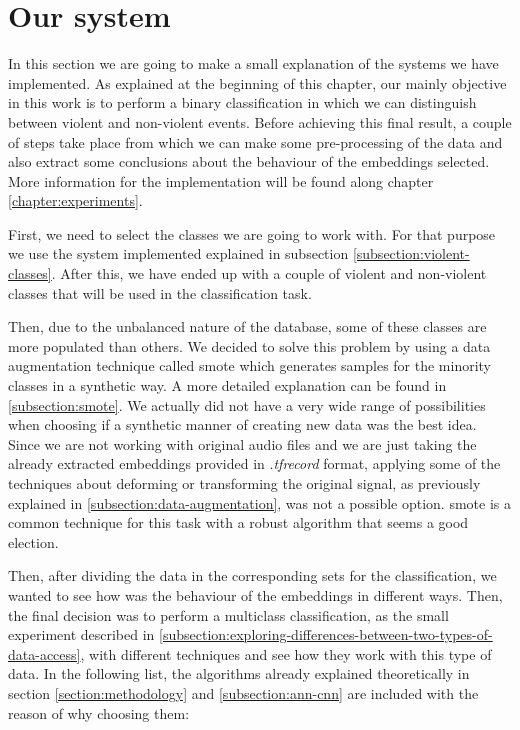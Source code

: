 \section{Our system}
\label{section:our-system}
	
	In this section we are going to make a small explanation of the systems we have implemented. As explained at the beginning of this chapter, our mainly objective in this work is to perform a binary classification in which we can distinguish between violent and non-violent events. Before achieving this final result, a couple of steps take place from which we can make some pre-processing of the data and also extract some conclusions about the behaviour of the embeddings selected. More information for the implementation will be found along chapter \ref{chapter:experiments}.
	
	First, we need to select the classes we are going to work with. For that purpose we use the system implemented explained in subsection \ref{subsection:violent-classes}. After this, we have ended up with a couple of violent and non-violent classes that will be used in the classification task.
	
	Then, due to the unbalanced nature of the database, some of these classes are more populated than others. We decided to solve this problem by using a data augmentation technique called \acrshort{smote} which generates samples for the minority classes in a synthetic way. A more detailed explanation can be found in \ref{subsection:smote}. We actually did not have a very wide range of possibilities when choosing if a synthetic manner of creating new data was the best idea. Since we are not working with original audio files and we are just taking the already extracted embeddings provided in .\textit{tfrecord} format, applying some of the techniques about deforming or transforming the original signal, as previously explained in \ref{subsection:data-augmentation}, was not a possible option. \acrshort{smote} is a common technique for this task with a robust algorithm that seems a good election.
	
	Then, after dividing the data in the corresponding sets for the classification, we wanted to see how was the behaviour of the embeddings in different ways. Then, the final decision was to perform a multiclass classification, as the small experiment described in \ref{subsection:exploring-differences-between-two-types-of-data-access},  with different techniques and see how they work with this type of data. In the following list, the algorithms already explained theoretically in section \ref{section:methodology} and \ref{subsection:ann-cnn} are included with the reason of why choosing them:
	

